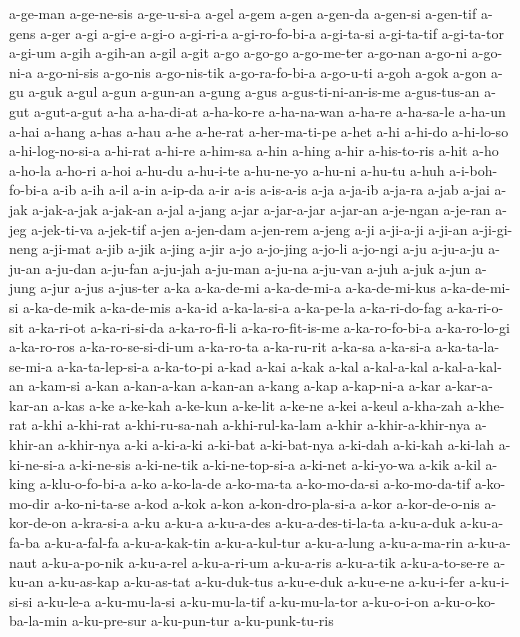 {a-ge-man a-ge-ne-sis a-ge-u-si-a a-gel a-gem a-gen a-gen-da a-gen-si
a-gen-tif a-gens a-ger a-gi a-gi-e a-gi-o a-gi-ri-a a-gi-ro-fo-bi-a
a-gi-ta-si a-gi-ta-tif a-gi-ta-tor a-gi-um a-gih a-gih-an a-gil a-git a-go
a-go-go a-go-me-ter a-go-nan a-go-ni a-go-ni-a a-go-ni-sis a-go-nis
a-go-nis-tik a-go-ra-fo-bi-a a-go-u-ti a-goh a-gok a-gon a-gu a-guk a-gul
a-gun a-gun-an a-gung a-gus a-gus-ti-ni-an-is-me a-gus-tus-an a-gut
a-gut-a-gut a-ha a-ha-di-at a-ha-ko-re a-ha-na-wan a-ha-re a-ha-sa-le
a-ha-un a-hai a-hang a-has a-hau a-he a-he-rat a-her-ma-ti-pe a-het a-hi
a-hi-do a-hi-lo-so a-hi-log-no-si-a a-hi-rat a-hi-re a-him-sa a-hin a-hing
a-hir a-his-to-ris a-hit a-ho a-ho-la a-ho-ri a-hoi a-hu-du a-hu-i-te
a-hu-ne-yo a-hu-ni a-hu-tu a-huh a-i-boh-fo-bi-a a-ib a-ih a-il a-in
a-ip-da a-ir a-is a-is-a-is a-ja a-ja-ib a-ja-ra a-jab a-jai a-jak
a-jak-a-jak a-jak-an a-jal a-jang a-jar a-jar-a-jar a-jar-an a-je-ngan
a-je-ran a-jeg a-jek-ti-va a-jek-tif a-jen a-jen-dam a-jen-rem a-jeng a-ji
a-ji-a-ji a-ji-an a-ji-gi-neng a-ji-mat a-jib a-jik a-jing a-jir a-jo
a-jo-jing a-jo-li a-jo-ngi a-ju a-ju-a-ju a-ju-an a-ju-dan a-ju-fan
a-ju-jah a-ju-man a-ju-na a-ju-van a-juh a-juk a-jun a-jung a-jur a-jus
a-jus-ter a-ka a-ka-de-mi a-ka-de-mi-a a-ka-de-mi-kus a-ka-de-mi-si
a-ka-de-mik a-ka-de-mis a-ka-id a-ka-la-si-a a-ka-pe-la a-ka-ri-do-fag
a-ka-ri-o-sit a-ka-ri-ot a-ka-ri-si-da a-ka-ro-fi-li a-ka-ro-fit-is-me
a-ka-ro-fo-bi-a a-ka-ro-lo-gi a-ka-ro-ros a-ka-ro-se-si-di-um a-ka-ro-ta
a-ka-ru-rit a-ka-sa a-ka-si-a a-ka-ta-la-se-mi-a a-ka-ta-lep-si-a
a-ka-to-pi a-kad a-kai a-kak a-kal a-kal-a-kal a-kal-a-kal-an a-kam-si
a-kan a-kan-a-kan a-kan-an a-kang a-kap a-kap-ni-a a-kar a-kar-a-kar-an
a-kas a-ke a-ke-kah a-ke-kun a-ke-lit a-ke-ne a-kei a-keul a-kha-zah
a-khe-rat a-khi a-khi-rat a-khi-ru-sa-nah a-khi-rul-ka-lam a-khir
a-khir-a-khir-nya a-khir-an a-khir-nya a-ki a-ki-a-ki a-ki-bat
a-ki-bat-nya a-ki-dah a-ki-kah a-ki-lah a-ki-ne-si-a a-ki-ne-sis
a-ki-ne-tik a-ki-ne-top-si-a a-ki-net a-ki-yo-wa a-kik a-kil a-king
a-klu-o-fo-bi-a a-ko a-ko-la-de a-ko-ma-ta a-ko-mo-da-si a-ko-mo-da-tif
a-ko-mo-dir a-ko-ni-ta-se a-kod a-kok a-kon a-kon-dro-pla-si-a a-kor
a-kor-de-o-nis a-kor-de-on a-kra-si-a a-ku a-ku-a a-ku-a-des
a-ku-a-des-ti-la-ta a-ku-a-duk a-ku-a-fa-ba a-ku-a-fal-fa a-ku-a-kak-tin
a-ku-a-kul-tur a-ku-a-lung a-ku-a-ma-rin a-ku-a-naut a-ku-a-po-nik
a-ku-a-rel a-ku-a-ri-um a-ku-a-ris a-ku-a-tik a-ku-a-to-se-re a-ku-an
a-ku-as-kap a-ku-as-tat a-ku-duk-tus a-ku-e-duk a-ku-e-ne a-ku-i-fer
a-ku-i-si-si a-ku-le-a a-ku-mu-la-si a-ku-mu-la-tif a-ku-mu-la-tor
a-ku-o-i-on a-ku-o-ko-ba-la-min a-ku-pre-sur a-ku-pun-tur a-ku-punk-tu-ris
}
